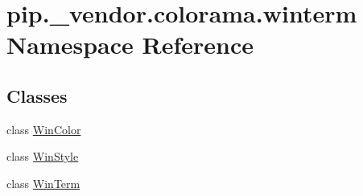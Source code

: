 \hypertarget{namespacepip_1_1__vendor_1_1colorama_1_1winterm}{}\section{pip.\+\_\+vendor.\+colorama.\+winterm Namespace Reference}
\label{namespacepip_1_1__vendor_1_1colorama_1_1winterm}
\subsection*{Classes}
\begin{DoxyCompactItemize}
\item 
class \hyperlink{classpip_1_1__vendor_1_1colorama_1_1winterm_1_1WinColor}{Win\+Color}
\item 
class \hyperlink{classpip_1_1__vendor_1_1colorama_1_1winterm_1_1WinStyle}{Win\+Style}
\item 
class \hyperlink{classpip_1_1__vendor_1_1colorama_1_1winterm_1_1WinTerm}{Win\+Term}
\end{DoxyCompactItemize}
